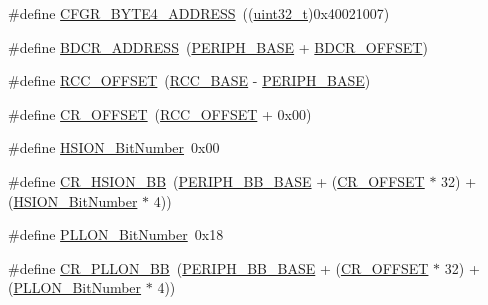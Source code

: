 \begin{DoxyCompactItemize}
\item 
\#define \hyperlink{group___r_c_c___private___defines_ga5fea86b59ec4be059d922db57cca3b3f}{C\+F\+G\+R\+\_\+\+B\+Y\+T\+E4\+\_\+\+A\+D\+D\+R\+E\+SS}~((\hyperlink{_p_e___types_8h_a33594304e786b158f3fb30289278f5af}{uint32\+\_\+t})0x40021007)
\item 
\#define \hyperlink{group___r_c_c___private___defines_ga40b5a415d697b6af7babd8a208c92435}{B\+D\+C\+R\+\_\+\+A\+D\+D\+R\+E\+SS}~(\hyperlink{openmotestm_2library_2inc_2stm32f10x__map_8h_a9171f49478fa86d932f89e78e73b88b0}{P\+E\+R\+I\+P\+H\+\_\+\+B\+A\+SE} + \hyperlink{openmotestm_2library_2src_2stm32f10x__rcc_8c_a5f8a0c3cb5f5c835bf7eef09515138ad}{B\+D\+C\+R\+\_\+\+O\+F\+F\+S\+ET})
\item 
\#define \hyperlink{group___r_c_c___private___defines_ga539e07c3b3c55f1f1d47231341fb11e1}{R\+C\+C\+\_\+\+O\+F\+F\+S\+ET}~(\hyperlink{openmotestm_2library_2inc_2stm32f10x__map_8h_a0e681b03f364532055d88f63fec0d99d}{R\+C\+C\+\_\+\+B\+A\+SE} -\/ \hyperlink{openmotestm_2library_2inc_2stm32f10x__map_8h_a9171f49478fa86d932f89e78e73b88b0}{P\+E\+R\+I\+P\+H\+\_\+\+B\+A\+SE})
\item 
\#define \hyperlink{group___r_c_c___private___defines_gafa1d3d0ea72132df651c76fc1bdffffc}{C\+R\+\_\+\+O\+F\+F\+S\+ET}~(\hyperlink{openmotestm_2library_2src_2stm32f10x__rcc_8c_a539e07c3b3c55f1f1d47231341fb11e1}{R\+C\+C\+\_\+\+O\+F\+F\+S\+ET} + 0x00)
\item 
\#define \hyperlink{group___r_c_c___private___defines_ga3d3085e491cbef815d223afbe5bf1930}{H\+S\+I\+O\+N\+\_\+\+Bit\+Number}~0x00
\item 
\#define \hyperlink{group___r_c_c___private___defines_gac3290a833c0e35ec17d32c2d494e6133}{C\+R\+\_\+\+H\+S\+I\+O\+N\+\_\+\+BB}~(\hyperlink{openmotestm_2library_2inc_2stm32f10x__map_8h_aed7efc100877000845c236ccdc9e144a}{P\+E\+R\+I\+P\+H\+\_\+\+B\+B\+\_\+\+B\+A\+SE} + (\hyperlink{openmotestm_2library_2src_2stm32f10x__rcc_8c_afa1d3d0ea72132df651c76fc1bdffffc}{C\+R\+\_\+\+O\+F\+F\+S\+ET} $\ast$ 32) + (\hyperlink{openmotestm_2library_2src_2stm32f10x__rcc_8c_a3d3085e491cbef815d223afbe5bf1930}{H\+S\+I\+O\+N\+\_\+\+Bit\+Number} $\ast$ 4))
\item 
\#define \hyperlink{group___r_c_c___private___defines_gab24d7f5f8e4b3b717fd91b54f393f6a3}{P\+L\+L\+O\+N\+\_\+\+Bit\+Number}~0x18
\item 
\#define \hyperlink{group___r_c_c___private___defines_ga3f1fb2589cb8b5ac2f7121aba1135a5f}{C\+R\+\_\+\+P\+L\+L\+O\+N\+\_\+\+BB}~(\hyperlink{openmotestm_2library_2inc_2stm32f10x__map_8h_aed7efc100877000845c236ccdc9e144a}{P\+E\+R\+I\+P\+H\+\_\+\+B\+B\+\_\+\+B\+A\+SE} + (\hyperlink{openmotestm_2library_2src_2stm32f10x__rcc_8c_afa1d3d0ea72132df651c76fc1bdffffc}{C\+R\+\_\+\+O\+F\+F\+S\+ET} $\ast$ 32) + (\hyperlink{openmotestm_2library_2src_2stm32f10x__rcc_8c_ab24d7f5f8e4b3b717fd91b54f393f6a3}{P\+L\+L\+O\+N\+\_\+\+Bit\+Number} $\ast$ 4))

\end{DoxyCompactItemize}
